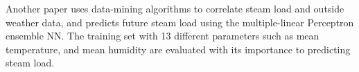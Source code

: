 Another paper \cite{kusiak_data-driven_2010} uses data-mining algorithms
to correlate steam load and outside weather data, and predicts
future steam load using the multiple-linear Perceptron ensemble
NN. The training set with 13 different parameters such as mean temperature,
and mean humidity are evaluated with its importance to predicting steam load.

